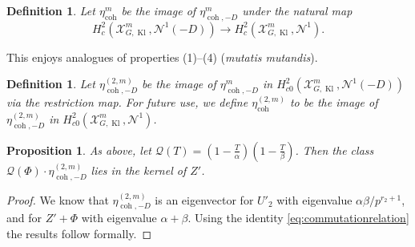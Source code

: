 \documentclass[cjm]{ipart}
\theoremstyle{plain}
\newtheorem{proposition}[theorem]{Proposition}
\newtheorem{definition}[theorem]{Definition}
\theoremstyle{remark}
\DeclareMathOperator{\coh}{coh}
\DeclareMathOperator{\Kl}{Kl}
\newcommand{\cN}{\mathcal{N}}
\newcommand{\cP}{\mathcal{P}}
\newcommand{\cQ}{\mathcal{Q}}
\newcommand{\cX}{\mathcal{X}}
\numberwithin{equation}{subsection}
\begin{document}
   \begin{definition}
    Let $\eta^m_{\coh}$ be the image of $\eta^m_{\coh,-D}$ under the natural map
    \[ H^2_c\left(\cX_{G,\Kl}^m, \cN^1(-D)\right) \to H^2_c\left(\cX_{G,\Kl}^m, \cN^1\right).\]
   \end{definition}

   This enjoys analogues of properties (1)--(4) (\emph{mutatis mutandis}).

   \begin{definition}
    Let $\eta^{(2, m)}_{\coh, -D}$ be the image of $\eta^m_{\coh, -D}$ in $H^2_{c0}\left(\cX_{G,\Kl}^m,\cN^1(-D)\right)$ via the restriction map. For future use, we define $\eta^{(2, m)}_{\coh}$ to be the image of $\eta^{(2, m)}_{\coh, -D}$ in $H^2_{c0}\left(\cX_{G,\Kl}^m,\cN^1\right)$.
   \end{definition}


  \begin{proposition}\label{prop:kerZ} As above, let $\cQ(T)=(1 - \tfrac{T}{\alpha})( 1 - \tfrac{T}{\beta})$. Then the class $\cQ(\Phi)\cdot \eta^{(2, m)}_{\coh,-D}$ lies in the kernel of $Z'$.
  \end{proposition}

   \begin{proof}
   We know that $\eta^{(2, m)}_{\coh, -D}$ is an eigenvector for $U'_2$ with eigenvalue $\alpha\beta / p^{r_2 + 1}$, and for $Z' + \Phi$ with eigenvalue $\alpha + \beta$. Using the identity \eqref{eq:commutationrelation} the results follow formally.
   \end{proof}

\end{document}
